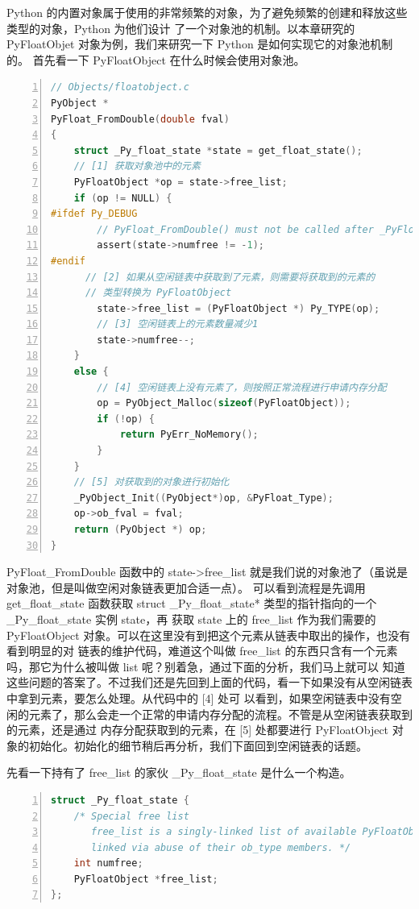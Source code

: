 Python 的内置对象属于使用的非常频繁的对象，为了避免频繁的创建和释放这些类型的对象，Python 为他们设计
了一个对象池的机制。以本章研究的 PyFloatObjet 对象为例，我们来研究一下 Python 是如何实现它的对象池机制的。
首先看一下 PyFloatObject 在什么时候会使用对象池。

\begin{lstlisting}[language=C, numbers=left, numbersep=1em, numberstyle=\footnotesize , breaklines=true]
// Objects/floatobject.c
PyObject *
PyFloat_FromDouble(double fval)
{
    struct _Py_float_state *state = get_float_state();
    // [1] 获取对象池中的元素
    PyFloatObject *op = state->free_list;
    if (op != NULL) {
#ifdef Py_DEBUG
        // PyFloat_FromDouble() must not be called after _PyFloat_Fini()
        assert(state->numfree != -1);
#endif
	  // [2] 如果从空闲链表中获取到了元素，则需要将获取到的元素的
	  // 类型转换为 PyFloatObject
        state->free_list = (PyFloatObject *) Py_TYPE(op);
        // [3] 空闲链表上的元素数量减少1
        state->numfree--;
    }
    else {
        // [4] 空闲链表上没有元素了，则按照正常流程进行申请内存分配
        op = PyObject_Malloc(sizeof(PyFloatObject));
        if (!op) {
            return PyErr_NoMemory();
        }
    }
    // [5] 对获取到的对象进行初始化
    _PyObject_Init((PyObject*)op, &PyFloat_Type);
    op->ob_fval = fval;
    return (PyObject *) op;
}

\end{lstlisting}

PyFloat\_FromDouble 函数中的 state->free\_list 就是我们说的对象池了（虽说是对象池，但是叫做空闲对象链表更加合适一点）。 
可以看到流程是先调用 get\_float\_state 函数获取 struct \_Py\_float\_state* 类型的指针指向的一个 \_Py\_float\_state 实例 state，再
获取 state 上的 free\_list 作为我们需要的 PyFloatObject 对象。可以在这里没有到把这个元素从链表中取出的操作，也没有看到明显的对
链表的维护代码，难道这个叫做 free\_list 的东西只含有一个元素吗，那它为什么被叫做 list 呢？别着急，通过下面的分析，我们马上就可以
知道这些问题的答案了。不过我们还是先回到上面的代码，看一下如果没有从空闲链表中拿到元素，要怎么处理。从代码中的 [4] 处可
以看到，如果空闲链表中没有空闲的元素了，那么会走一个正常的申请内存分配的流程。不管是从空闲链表获取到的元素，还是通过
内存分配获取到的元素，在 [5] 处都要进行  PyFloatObject 对象的初始化。初始化的细节稍后再分析，我们下面回到空闲链表的话题。

先看一下持有了 free\_list 的家伙 \_Py\_float\_state 是什么一个构造。

\begin{lstlisting}[language=C, numbers=left, numbersep=1em, numberstyle=\footnotesize , breaklines=true]
struct _Py_float_state {
    /* Special free list
       free_list is a singly-linked list of available PyFloatObjects,
       linked via abuse of their ob_type members. */
    int numfree;
    PyFloatObject *free_list;
};
\end{lstlisting}

